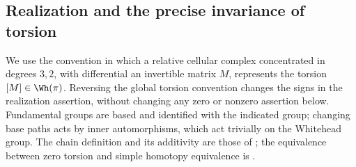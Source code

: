 \subsection{Realization and the precise invariance of torsion}
We use the convention in which a relative cellular complex concentrated
in degrees $3,2$, with differential an invertible matrix $M$, represents
the torsion $[M]\in\Wh(\pi)$. Reversing the global torsion convention
changes the signs in the realization assertion, without changing any
zero or nonzero assertion below. Fundamental groups are based and
identified with the indicated group; changing base paths acts by inner
automorphisms, which act trivially on the Whitehead group.
The chain definition and its additivity are those of
\cite[Definitions~12 and~17, Exercise~14]{I_LurieWhiteheadI};
the equivalence between zero torsion and simple homotopy equivalence
is \cite[Corollary~5 and Theorem~8]{I_LurieWhiteheadII}.

